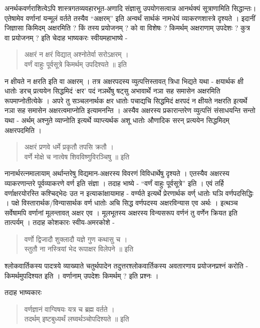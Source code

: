 {अनर्थकवर्णराशित्वेऽपि शास्त्रगतव्यवहारभूत-अणादि संज्ञासु उपयोगसत्वान्न आनर्थक्यं सूत्राणामिति सिद्धान्तः। एतेषामेव वर्णानां यन्मूलं वर्तते तस्यैव “अक्षरम्” इति अन्वर्थं सार्थकं नामधेयं व्याकरणशास्त्रे दृश्यते । इदानीं जिज्ञासा किमिदम् अक्षरमिति ? किं तस्य प्रयोजनम् ? को वा विशेषः ? किमर्थम् अक्षराणाम् उपदेशः ? कुत्र वा प्रयोजनम् ? इति चेदाह भाष्यकरः स्वीयमहाभाष्ये - 		
\begin{verse}
अक्षरं न क्षरं विद्यात्  अश्नोतेर्वा सरोऽक्षरम् ।\\
वर्णं वाहुः पूर्वसूत्रे किमर्थम् उपदिश्यते ॥ इति
\end{verse}
न क्षीयते न क्षरति इति वा अक्षरम् । तत्र अक्षरपदस्य व्युत्पत्तिस्तावत् त्रिधा भिद्यते यथा - क्षयार्थक क्षी धातोः डरच् प्रत्ययेन सिद्धमिदं ‘क्षर’ पदं नञर्थेषु षट्सु अभावार्थे नञा सह समासेन अक्षरमिति रूपमाप्नोतीत्येके । अपरे तु सञ्चलनार्थक क्षर धातोः पचाद्यचि सिद्धमिदं क्षरपदं न क्षीयते नक्षरति इत्यर्थे नञा सह समासेन अक्षरत्वमाप्नोति इत्यामनन्ति । अस्यैव अक्षरस्य  प्रकारान्तरेण व्युत्पत्तिं संसाधयन्ति सन्तो यथा - अर्थम् अश्नुते व्याप्नोति इत्यर्थे व्याप्त्यर्थक अशू धातोः औणादिक सरन् प्रत्ययेन सिद्धमिदम् अक्षरपदमिति ।
\begin{verse}
अक्षरं प्रणवे धर्मे प्रकृतौ तपसि क्रतौ ।\\
वर्णे मोक्षे च नात्वेष शिवविष्णुविरञ्चिषु ॥ इति
\end{verse}
नानार्थरत्नमालायाम् अर्थान्तरेषु विद्यमान-अक्षरस्य विवरणं विविधार्थेषु दृश्यते । एतस्यैव अक्षरस्य व्याकरणान्तरे पूर्वव्याकरणे वर्ण इति संज्ञा । तदाह भाष्ये - “वर्णं वाहुः पूर्वसूत्रे” इति । एवं तर्हि वर्णाक्षरयोरस्ति कश्चिद्भेदः उत न इत्याकांक्षायामाह - वर्ण्यते इत्यर्थे प्रेरणार्थक वर्ण् धातोः घञि वर्णपदसिद्धिः । पक्षे विस्तारार्थक/विन्यासार्थक वर्ण धातोः अचि सिद्ध वर्णपदस्य अक्षरविन्यास एव अर्थः । इत्थञ्च सर्वेषामपि वर्णानां मूलन्तावत् अक्षर एव । मूलभूतस्य अक्षरस्य विन्यसरूप वर्णनं तु वर्णेन क्रियत इति तात्पर्यम् । तदाह कोशकारः स्वीय-अमरकोशे -
\begin{verse}
वर्णो द्विजादौ शुक्लादौ यज्ञे गुण कथासु च ।\\
स्तुतौ ना नस्त्रियां भेद रूपाक्षर विलेपने ॥  इति
\end{verse}
श्लोकवार्तिकस्य पादत्रये व्याख्याते चतुर्थपादेन तदुत्तरश्लोकवार्तिकस्य अवतारणाय प्रयोजनप्रश्नं करोति - किमर्थमुपदिश्यत इति । वर्णानाम् उपदेशः किमर्थम् ? इति प्रश्नः ।

तदाह भाष्यकारः 		
\begin{verse}
वर्णज्ञानं वाग्विषयः यत्र च ब्रह्म वर्तते । \\
तदर्थम् इष्टबुध्यर्थं लघ्वर्थञ्चोपदिश्यते ॥ इति
\end{verse}

}
